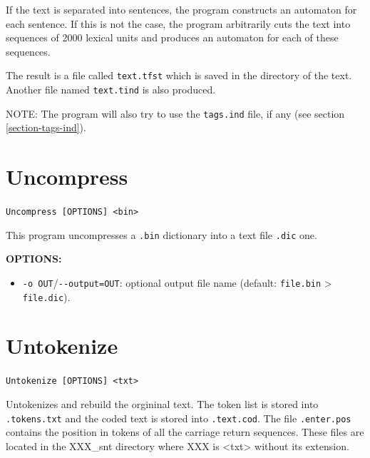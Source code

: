 \bigskip
\noindent If the text is separated into sentences, the program constructs an
automaton for each sentence. If this is not the case, the program arbitrarily
cuts the text into sequences of 2000 lexical units and produces an automaton for
each of these sequences.

\bigskip
\noindent The result is a file called \verb+text.tfst+ which is saved in the directory of
the text. Another file named \verb+text.tind+ is also produced.

\bigskip
\noindent NOTE: The program will also try to use the \verb+tags.ind+ file, if
any (see section \ref{section-tags-ind}).







\section{Uncompress}
\label{section-Uncompress}
\verb+Uncompress [OPTIONS] <bin>+

\bigskip
\noindent This program uncompresses a \verb+.bin+ dictionary into a text file
\verb+.dic+ one.

\bigskip
\noindent \textbf{OPTIONS:}
\begin{itemize}
  \item \verb+-o OUT+/\verb+--output=OUT+: optional output file name (default:
  \verb+file.bin+ > \verb+file.dic+).
\end{itemize}








\section{Untokenize}
\label{section-Untokenize}
\verb+Untokenize [OPTIONS] <txt>+

\bigskip
\noindent Untokenizes and rebuild the orgininal text. The token list is stored into \verb+.tokens.txt+ and
         the coded text is stored into \verb+.text.cod+.
         The file \verb+.enter.pos+ contains the position in tokens of all the carriage return sequences.
         These files are located in the XXX\_snt directory where XXX is <txt> without its extension.

